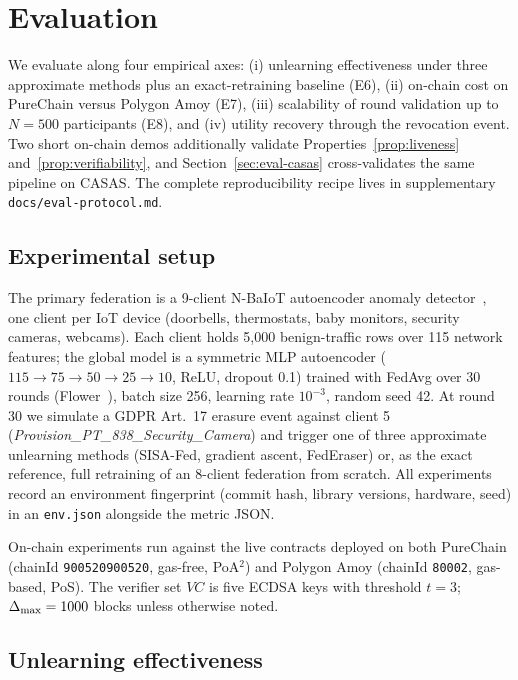 \section{Evaluation}
\label{sec:evaluation}

We evaluate \sysname along four empirical axes: (i) unlearning
effectiveness under three approximate methods plus an
exact-retraining baseline (E6), (ii) on-chain cost on PureChain
versus Polygon Amoy (E7), (iii) scalability of round validation up
to $N\!=\!500$ participants (E8), and (iv) utility recovery through
the revocation event. Two short on-chain demos additionally validate
Properties~\ref{prop:liveness} and~\ref{prop:verifiability}, and
Section~\ref{sec:eval-casas} cross-validates the same pipeline on CASAS.
The complete reproducibility recipe lives in supplementary
\texttt{docs/eval-protocol.md}.

\subsection{Experimental setup}
\label{sec:eval-setup}

The primary federation is a 9-client N-BaIoT autoencoder anomaly
detector~\cite{meidan2018nbaiot}, one client per IoT device (doorbells,
thermostats, baby monitors, security cameras, webcams). Each client
holds 5{,}000 benign-traffic rows over 115 network features; the
global model is a symmetric MLP autoencoder
($115\!\to\!75\!\to\!50\!\to\!25\!\to\!10$, ReLU, dropout 0.1) trained
with FedAvg over 30 rounds (Flower~\cite{beutel2020flower}),
batch size 256, learning rate $10^{-3}$, random seed 42. At round 30 we simulate a GDPR Art.~17 erasure event
against client 5 (\textit{Provision\_PT\_838\_Security\_Camera}) and
trigger one of three approximate unlearning methods (SISA-Fed,
gradient ascent, FedEraser) or, as the exact reference, full
retraining of an 8-client federation from scratch. All experiments
record an environment fingerprint (commit hash, library versions,
hardware, seed) in an \texttt{env.json} alongside the metric JSON.

On-chain experiments run against the live contracts deployed on both
PureChain (chainId \texttt{900520900520}, gas-free, PoA$^2$) and
Polygon Amoy (chainId \texttt{80002}, gas-based, PoS). The verifier
set $\mathit{VC}$ is five ECDSA keys with threshold $t = 3$;
$\Delta_{\max} = 1000$ blocks unless otherwise noted.

\subsection{Unlearning effectiveness}
\label{sec:eval-unlearning}

